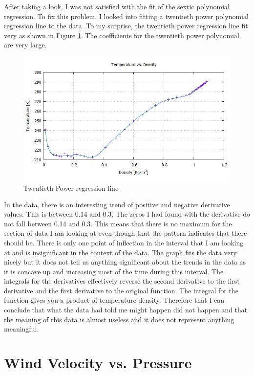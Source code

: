 \documentclass{article}
\begin{document}
After taking a look, I was not satisfied with the fit of the sextic polynomial regression. To fix this problem, I looked into fitting a twentieth power polynomial regression line to the data. To my surprise, the twentieth power regression line fit very as shown in Figure \ref{nate2}.
The coefficients for the twentieth power polynomial are very large.

\begin{figure}[p]
\centering
\includegraphics[scale=0.5]{nate-data/twenty}
\caption{Twentieth Power regression line}
\label{nate2}
\end{figure}

In the data, there is an interesting trend of positive and negative derivative values. This is between 0.14 and 0.3. The zeros I had found with the derivative do not fall between 0.14 and 0.3. This means that there is no maximum for the section of data I am looking at even though that the pattern indicates that there should be. There is only one point of inflection in the interval that I am looking at and is insignificant in the context of the data. The graph fits the data very nicely but it does not tell us anything significant about the trends in the data as it is concave up and increasing most of the time during this interval. The integrals for the derivatives effectively reverse the second derivative to the first derivative and the first derivative to the original function. The integral for the function gives you a product of temperature density. Therefore that I can conclude that what the data had told me might happen did not happen and that the meaning of this data is almost useless and it does not represent anything meaningful.



\part{Wind Velocity vs. Pressure}
\label{george}
\end{document}
